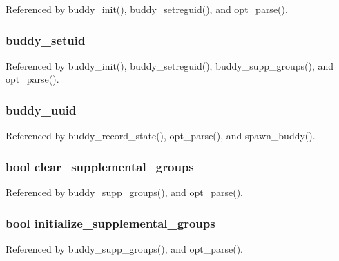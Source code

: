 Referenced by buddy\_\-init(), buddy\_\-setreguid(), and opt\_\-parse().

\subsubsection[{buddy\_\-setuid}]{ {\bf buddy\_\-setuid}}\label{buddy_8h_a2ef8d11cc4ac2862fbe8ce2112e2e4fb}


Referenced by buddy\_\-init(), buddy\_\-setreguid(), buddy\_\-supp\_\-groups(), and opt\_\-parse().

\subsubsection[{buddy\_\-uuid}]{ {\bf buddy\_\-uuid}}\label{buddy_8h_a3e9321d881ca257289c65b5022b693c8}


Referenced by buddy\_\-record\_\-state(), opt\_\-parse(), and spawn\_\-buddy().

\subsubsection[{clear\_\-supplemental\_\-groups}]{\setlength{\rightskip}{0pt plus 5cm}bool {\bf clear\_\-supplemental\_\-groups}}\label{buddy_8h_a535a3bdf28e5f018da53680703092e1b}


Referenced by buddy\_\-supp\_\-groups(), and opt\_\-parse().

\subsubsection[{initialize\_\-supplemental\_\-groups}]{\setlength{\rightskip}{0pt plus 5cm}bool {\bf initialize\_\-supplemental\_\-groups}}\label{buddy_8h_ab0872a08f4362ca27dba55fcef64c24f}


Referenced by buddy\_\-supp\_\-groups(), and opt\_\-parse().

